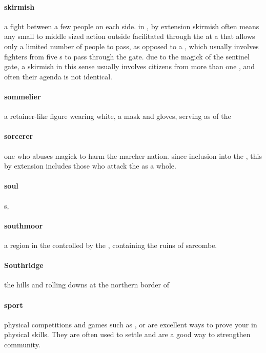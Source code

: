 \paragraph{skirmish} a fight between a few people on each side. in , by extension skirmish often means any small to middle sized action outside  facilitated through the  at a  that allows only a limited number of people to pass, as opposed to a , which usually involves fighters from five s to pass through the gate. due to the magick of the sentinel gate, a skirmish in this sense usually involves citizens from more than one , and often their agenda is not identical.
\paragraph{sommelier} a retainer-like figure wearing white, a mask and gloves, serving as  of the 
\paragraph{sorcerer} one who abuses magick to harm the marcher nation. since inclusion into the , this by extension includes those who attack the  as a whole. 
\paragraph{soul} s, 
\paragraph{southmoor} a region in the  controlled by the , containing the ruins of sarcombe.
\paragraph{Southridge} the hills and rolling downs at the northern border of 
\paragraph{sport} physical competitions and games such as ,  or  are excellent ways to prove your  in physical skills. They are often used to settle  and are a good way to strengthen community. 
